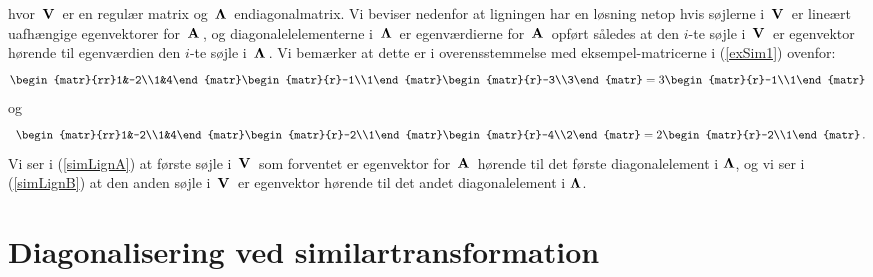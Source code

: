 hvor $\,\mathbf{V}\,$ er en regulær matrix og $\,\bm{\Lambda}\,$ endiagonalmatrix. Vi beviser nedenfor at ligningen har en løsning netop hvis søjlerne i $\,\mathbf{V}\,$ er lineært uafhængige egenvektorer for $\,\mathbf{A}\,$, og diagonalelelementerne i $\,\bm{\Lambda}\,$ er egenværdierne for $\,\mathbf{A}\,$ opført således at den $i$-te søjle i $\,\mathbf{V}\,$ er egenvektor hørende til egenværdien den $i$-te søjle i $\,\bm{\Lambda}\,$.\bs
Vi bemærker at dette er i overensstemmelse med eksempel-matricerne i (\ref{exSim1}) ovenfor:
\begin{equation}\label{simLignA}
\begin{matr}{rr}1&-2\\1&4\end{matr}
\begin{matr}{r}-1\\1\end{matr}
\begin{matr}{r}-3\\3\end{matr}=
3\begin{matr}{r}-1\\1\end{matr}\end{equation}
og
\begin{equation}\label{simLignB}
{\,\,\,}\begin{matr}{rr}1&-2\\1&4\end{matr}
\begin{matr}{r}-2\\1\end{matr}
\begin{matr}{r}-4\\2\end{matr}=
2\begin{matr}{r}-2\\1\end{matr}\,.\end{equation}
Vi ser i (\ref{simLignA}) at første søjle i $\,\mathbf{V}\,$ som forventet er egenvektor for $\,\mathbf{A}\,$ hørende til det første diagonalelement i $\bm{\Lambda}$, og vi ser i (\ref{simLignB}) at den anden søjle i $\,\mathbf{V}\,$ er egenvektor hørende til det andet diagonalelement i $\bm{\Lambda}$.

\section{Diagonalisering ved similartransformation}

